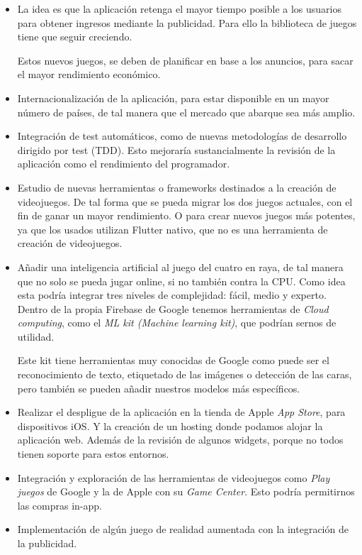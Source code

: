 \begin{itemize}
\item La idea es que la aplicación retenga el mayor tiempo posible a los usuarios para obtener ingresos mediante la publicidad. Para ello la biblioteca de juegos tiene que seguir creciendo. 

Estos nuevos juegos, se deben de planificar en base a los anuncios, para sacar el mayor rendimiento económico.

\item Internacionalización de la aplicación, para estar disponible en un mayor número de países, de tal manera que el mercado que abarque sea más amplio.

\item Integración de test automáticos, como de nuevas metodologías de desarrollo dirigido por test (TDD). Esto mejoraría sustancialmente la revisión de la aplicación como el rendimiento del programador.

\item Estudio de nuevas herramientas o frameworks destinados a la creación de videojuegos. De tal forma que se pueda migrar los dos juegos actuales, con el fin de ganar un mayor rendimiento. O para crear nuevos juegos más potentes, ya que los usados utilizan Flutter nativo, que no es una herramienta de creación de videojuegos.

\item Añadir una inteligencia artificial al juego del cuatro en raya, de tal manera que no solo se pueda jugar online, si no también contra la CPU. Como idea esta podría integrar tres niveles de complejidad: fácil, medio y experto. Dentro de la propia Firebase de Google tenemos herramientas de \emph{Cloud computing}, como el \emph{ML kit (Machine learning kit)}, que podrían sernos de utilidad. 

Este kit tiene herramientas muy conocidas de Google como puede ser el reconocimiento de texto, etiquetado de las imágenes o detección de las caras, pero también se pueden añadir nuestros modelos más específicos.

\item Realizar el despligue de la aplicación en la tienda de Apple \emph{App Store}, para dispositivos iOS. Y la creación de un hosting donde podamos alojar la aplicación web. Además de la revisión de algunos widgets, porque no todos tienen soporte para estos entornos.
	
\item Integración y exploración de las herramientas de videojuegos como \emph{Play juegos} de Google y la de Apple con su \emph{Game Center}. Esto podría permitirnos las compras in-app.

\item Implementación de algún juego de realidad aumentada con la integración de la publicidad.
\end{itemize}